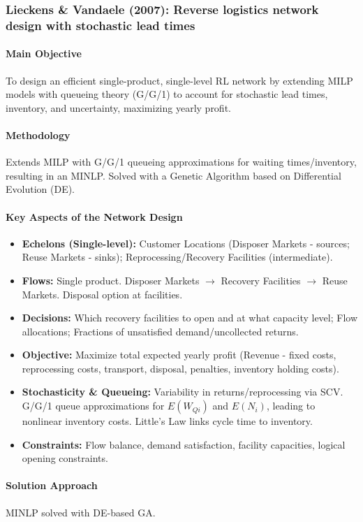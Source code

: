 \subsubsection{Lieckens \& Vandaele (2007): Reverse logistics network design with stochastic lead times}
\paragraph{Main Objective} To design an efficient single-product, single-level RL network by extending MILP models with queueing theory (G/G/1) to account for stochastic lead times, inventory, and uncertainty, maximizing yearly profit.
\paragraph{Methodology} Extends MILP with G/G/1 queueing approximations for waiting times/inventory, resulting in an MINLP. Solved with a Genetic Algorithm based on Differential Evolution (DE).
\paragraph{Key Aspects of the Network Design}
\begin{itemize}
    \item \textbf{Echelons (Single-level):} Customer Locations (Disposer Markets - sources; Reuse Markets - sinks); Reprocessing/Recovery Facilities (intermediate).
    \item \textbf{Flows:} Single product. Disposer Markets $\rightarrow$ Recovery Facilities $\rightarrow$ Reuse Markets. Disposal option at facilities.
    \item \textbf{Decisions:} Which recovery facilities to open and at what capacity level; Flow allocations; Fractions of unsatisfied demand/uncollected returns.
    \item \textbf{Objective:} Maximize total expected yearly profit (Revenue - fixed costs, reprocessing costs, transport, disposal, penalties, inventory holding costs).
    \item \textbf{Stochasticity \& Queueing:} Variability in returns/reprocessing via SCV. G/G/1 queue approximations for $E(W_{Qi})$ and $E(N_i)$, leading to nonlinear inventory costs. Little's Law links cycle time to inventory.
    \item \textbf{Constraints:} Flow balance, demand satisfaction, facility capacities, logical opening constraints.
\end{itemize}
\paragraph{Solution Approach} MINLP solved with DE-based GA.
